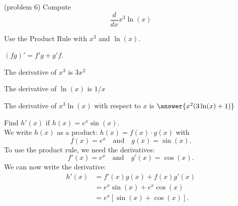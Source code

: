 \documentclass[handout]{ximera}
\begin{document}
\begin{center}
\begin{foldable}
\end{foldable}
\end{center}



\begin{problem}(problem 6)
  Compute
  \[
  \frac{d}{dx} x^3\ln(x)
  \]
  
    \begin{hint}
      Use the Product Rule with $x^3$ and $\ln(x)$.
    \end{hint}
    \begin{hint}
      $(fg)' = f'g+g'f$.
    \end{hint}
    \begin{hint}
      The derivative of $x^3$ is $3x^2$
    \end{hint}
    \begin{hint}
      The derivative of $\ln(x)$ is $1/x$
    \end{hint}
		The derivative of $x^3\ln(x)$ with respect to $x$ is
		 $\answer{x^2(3 \ln(x) + 1)}$
		
\end{problem}


\begin{example}[example 7]
Find $h'(x)$ if $h(x) = e^x\sin(x)$.\\
We write $h(x)$ as a product: $h(x) = f(x)\cdot g(x)$ with
\[f(x) = e^x \quad \text{and} \quad g(x) = \sin(x).\]
To use the product rule, we need the derivatives:
\[f'(x) = e^x \quad \text{and} \quad g'(x) = \cos(x).\]
We can now write the derivative:
\begin{align*}
h'(x) &= f'(x)g(x) + f(x)g'(x) \\
&= e^x \sin(x) + e^x \cos(x) \\
&= e^x[\sin(x) +  \cos(x)].
\end{align*}
\end{example}


\begin{center}
\begin{foldable}
\end{foldable}
\end{center}
\end{document}
